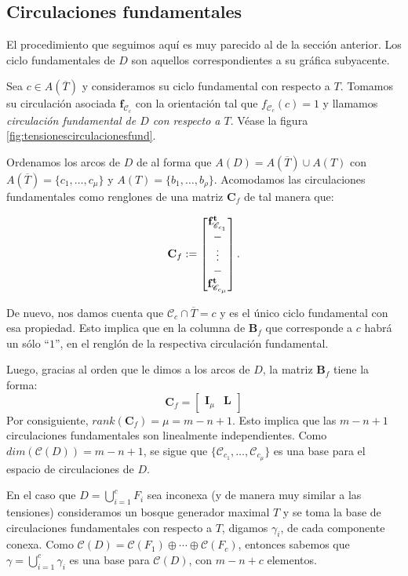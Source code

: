 \subsection{Circulaciones fundamentales}
El procedimiento que seguimos aquí es muy parecido al de la sección anterior. Los ciclo fundamentales de $D$ son aquellos correspondientes a su gráfica subyacente. 

Sea $c \in A(\overline{T})$ y consideramos su ciclo fundamental con respecto a $T$.  Tomamos su circulación asociada $\mathbf{f}_{\mathscr{C}_{c}}$ con la orientación tal que $f_{\mathscr{C}_{c}}(c)=1$ y llamamos \textit{circulación fundamental de $D$ con respecto a $T$}. Véase la figura \ref{fig:tensionescirculacionesfund}.

Ordenamos los arcos de $D$ de al forma que $A(D) = A(\overline{T}) \cup A(T) $ con $A(\overline{T}) = \{c_{1}, \ldots, c_{\mu}\}$ y $A(T) = \{b_{1}, \ldots, b_{\rho}\}$. Acomodamos las circulaciones fundamentales como renglones de una matriz $\mathbf{C}_{f}$ de tal manera que:

$$
\mathbf{C}_{f} := \begin{bmatrix}
\mathbf{f}_{\mathscr{C}_{c_{1}}}^{\mathbf{t}} \\
\-- \\
\vdots \\
\-- \\
\mathbf{f}_{\mathscr{C}_{c_{\mu}}}^{\mathbf{t}}
\end{bmatrix}.
$$

De nuevo, nos damos cuenta que $\mathscr{C}_{c} \cap \overline{T} = c$ y es el único ciclo fundamental con esa propiedad. Esto implica que en la columna de $\mathbf{B}_{f}$ que corresponde a $c$ habrá un sólo ``$1$'', en el renglón de la respectiva circulación fundamental.

Luego, gracias al orden que le dimos a los arcos de $D$, la matriz $\mathbf{B}_{f}$ tiene la forma:
$$
\mathbf{C}_{f} = \begin{bmatrix}
\mathbf{I}_{\mu} & \mathbf{L} 
\end{bmatrix}
$$
Por consiguiente, $rank(\mathbf{C}_{f}) = \mu = m - n + 1$. Esto implica que las $m - n +1$ circulaciones fundamentales son linealmente independientes. Como $dim(\mathcal{C}(D)) = m - n +1$, se sigue que $\{\mathscr{C}_{c_{1}}, \ldots, \mathscr{C}_{c_{\mu}}\}$ es una base para el espacio de circulaciones de $D$.

En el caso que $D = \bigcup_{i = 1}^{c} F_{i}$ sea inconexa (y de manera muy similar a las tensiones) consideramos  un bosque generador maximal $T$ y se toma la base de circulaciones fundamentales con respecto a $T$, digamos $\gamma_{i}$, de cada componente conexa. Como $\mathcal{C}(D) = \mathcal{C}(F_{1}) \oplus \cdots \oplus \mathcal{C}(F_{c})$, entonces sabemos que $\gamma = \bigcup_{i =1}^{c}\gamma_{i}$ es una base para $\mathcal{C}(D)$, con $m - n + c$ elementos.

